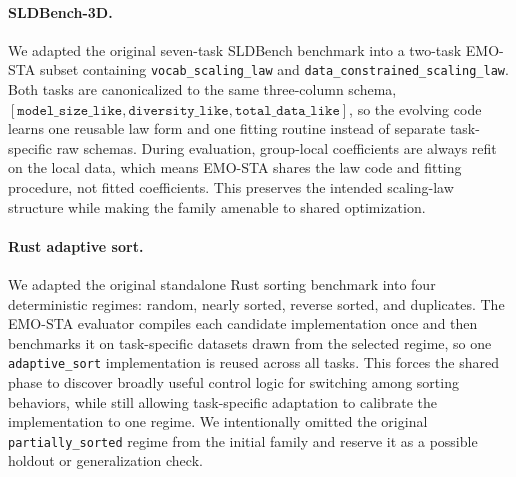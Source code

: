 \paragraph{SLDBench-3D.}
We adapted the original seven-task SLDBench benchmark into a two-task EMO-STA subset containing \texttt{vocab\_scaling\_law} and \texttt{data\_constrained\_scaling\_law}. Both tasks are canonicalized to the same three-column schema, \([\texttt{model\_size\_like}, \texttt{diversity\_like}, \texttt{total\_data\_like}]\), so the evolving code learns one reusable law form and one fitting routine instead of separate task-specific raw schemas. During evaluation, group-local coefficients are always refit on the local data, which means EMO-STA shares the law code and fitting procedure, not fitted coefficients. This preserves the intended scaling-law structure while making the family amenable to shared optimization.

\paragraph{Rust adaptive sort.}
We adapted the original standalone Rust sorting benchmark into four deterministic regimes: random, nearly sorted, reverse sorted, and duplicates. The EMO-STA evaluator compiles each candidate implementation once and then benchmarks it on task-specific datasets drawn from the selected regime, so one \texttt{adaptive\_sort} implementation is reused across all tasks. This forces the shared phase to discover broadly useful control logic for switching among sorting behaviors, while still allowing task-specific adaptation to calibrate the implementation to one regime. We intentionally omitted the original \texttt{partially\_sorted} regime from the initial family and reserve it as a possible holdout or generalization check.

